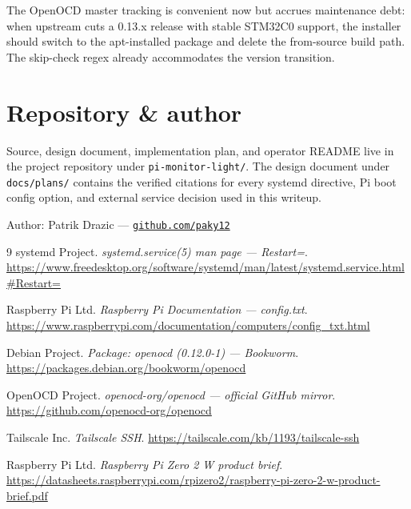 \documentclass[11pt,a4paper]{article}
\begin{document}
The OpenOCD master tracking is convenient now but accrues maintenance
debt: when upstream cuts a 0.13.x release with stable STM32C0
support, the installer should switch to the apt-installed package and
delete the from-source build path. The skip-check regex already
accommodates the version transition.

\section*{Repository \& author}

Source, design document, implementation plan, and operator README live
in the project repository under \texttt{pi-monitor-light/}. The design
document under \texttt{docs/plans/} contains the verified citations
for every systemd directive, Pi boot config option, and external
service decision used in this writeup.

\smallskip\noindent
Author: Patrik Drazic ---
\href{https://github.com/paky12}{\nolinkurl{github.com/paky12}}

\begin{thebibliography}{9}\small
{}
systemd Project. \emph{systemd.service(5) man page --- Restart=}.
\url{https://www.freedesktop.org/software/systemd/man/latest/systemd.service.html#Restart=}

Raspberry Pi Ltd. \emph{Raspberry Pi Documentation --- config.txt}.
\url{https://www.raspberrypi.com/documentation/computers/config_txt.html}

Debian Project. \emph{Package: openocd (0.12.0-1) --- Bookworm}.
\url{https://packages.debian.org/bookworm/openocd}

OpenOCD Project. \emph{openocd-org/openocd --- official GitHub mirror}.
\url{https://github.com/openocd-org/openocd}

Tailscale Inc. \emph{Tailscale SSH}.
\url{https://tailscale.com/kb/1193/tailscale-ssh}

Raspberry Pi Ltd. \emph{Raspberry Pi Zero 2 W product brief}.
\url{https://datasheets.raspberrypi.com/rpizero2/raspberry-pi-zero-2-w-product-brief.pdf}
\end{thebibliography}
\end{document}
